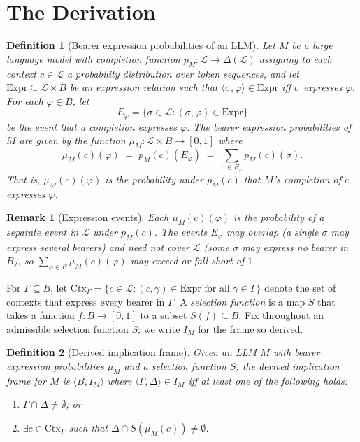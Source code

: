 \documentclass[11pt]{article}
\newtheorem{definition}{Definition}
\newtheorem{remark}{Remark}
\begin{document}
\section{The Derivation}

\begin{definition}[Bearer expression probabilities of an LLM]
\label{def:mu}
Let $M$ be a large language model with completion function $p_M : \mathcal{L} \to \Delta(\mathcal{L})$ assigning to each context $c \in \mathcal{L}$ a probability distribution over token sequences, and let $\mathrm{Expr} \subseteq \mathcal{L} \times B$ be an expression relation such that $\langle \sigma, \varphi \rangle \in \mathrm{Expr}$ iff $\sigma$ expresses $\varphi$. For each $\varphi \in B$, let
\[
E_\varphi = \{\sigma \in \mathcal{L} : (\sigma, \varphi) \in \mathrm{Expr}\}
\]
be the event that a completion expresses $\varphi$. The \emph{bearer expression probabilities of $M$} are given by the function $\mu_M : \mathcal{L} \times B \to [0,1]$ where
\[
\mu_M(c)(\varphi) \;=\; p_M(c)(E_\varphi) \;=\; \sum_{\sigma \in E_\varphi} p_M(c)(\sigma).
\]
That is, $\mu_M(c)(\varphi)$ is the probability under $p_M(c)$ that $M$'s completion of $c$ expresses $\varphi$.
\end{definition}

\begin{remark}[Expression events]
\label{rem:expression-events}
Each $\mu_M(c)(\varphi)$ is the probability of a separate event in $\mathcal{L}$ under $p_M(c)$. The events $E_\varphi$ may overlap (a single $\sigma$ may express several bearers) and need not cover $\mathcal{L}$ (some $\sigma$ may express no bearer in $B$), so $\sum_{\varphi \in B} \mu_M(c)(\varphi)$ may exceed or fall short of $1$.
\end{remark}

For $\Gamma \subseteq B$, let $\mathrm{Ctx}_\Gamma = \{c \in \mathcal{L} : (c, \gamma) \in \mathrm{Expr} \text{ for all } \gamma \in \Gamma\}$ denote the set of contexts that express every bearer in $\Gamma$. A \emph{selection function} is a map $S$ that takes a function $f : B \to [0,1]$ to a subset $S(f) \subseteq B$. Fix throughout an admissible selection function $S$; we write $I_M$ for the frame so derived.

\begin{definition}[Derived implication frame]
\label{def:frame}
Given an LLM $M$ with bearer expression probabilities $\mu_M$ and a selection function $S$, the \emph{derived implication frame for $M$} is $\langle B, I_M \rangle$ where $\langle \Gamma, \Delta \rangle \in I_M$ iff at least one of the following holds:
\begin{enumerate}[label=(\roman*)]
\item $\Gamma \cap \Delta \neq \emptyset$; or
\item $\exists c \in \mathrm{Ctx}_\Gamma$ such that $\Delta \cap S(\mu_M(c)) \neq \emptyset$.
\end{enumerate}
\end{definition}
\end{document}
